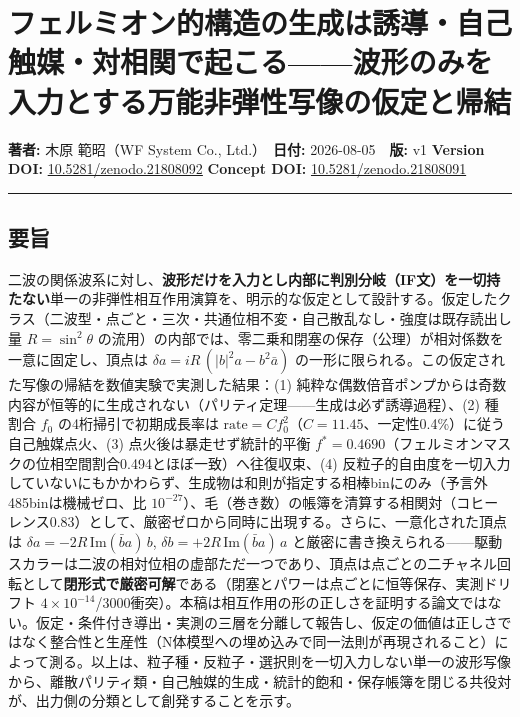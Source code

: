 \documentclass[
  a4paper,
]{ltjsarticle}
\author{}
\date{}
\begin{document}
\section{フェルミオン的構造の生成は誘導・自己触媒・対相関で起こる------波形のみを入力とする万能非弾性写像の仮定と帰結}\label{ux30d5ux30a7ux30ebux30dfux30aaux30f3ux7684ux69cbux9020ux306eux751fux6210ux306fux8a98ux5c0eux81eaux5df1ux89e6ux5a92ux5bfeux76f8ux95a2ux3067ux8d77ux3053ux308bux6ce2ux5f62ux306eux307fux3092ux5165ux529bux3068ux3059ux308bux4e07ux80fdux975eux5f3eux6027ux5199ux50cfux306eux4eeeux5b9aux3068ux5e30ux7d50}

\textbf{著者:} 木原 範昭（WF System Co., Ltd.）　\textbf{日付:}
2026-08-05　\textbf{版:} v1 \textbf{Version DOI:}
\href{https://doi.org/10.5281/zenodo.21808092}{10.5281/zenodo.21808092}
\textbf{Concept DOI:}
\href{https://doi.org/10.5281/zenodo.21808091}{10.5281/zenodo.21808091}

\begin{center}\rule{0.5\linewidth}{0.5pt}\end{center}

\subsection{要旨}\label{ux8981ux65e8}

二波の関係波系に対し、\textbf{波形だけを入力とし内部に判別分岐（IF文）を一切持たない}単一の非弾性相互作用演算を、明示的な仮定として設計する。仮定したクラス（二波型・点ごと・三次・共通位相不変・自己散乱なし・強度は既存読出し量
\(R=\sin^2\theta\)
の流用）の内部では、零二乗和閉塞の保存（公理）が相対係数を一意に固定し、頂点は
\(\delta a = i R\,(|b|^2 a - b^2 \bar a)\)
の一形に限られる。この仮定された写像の帰結を数値実験で実測した結果：(1)
純粋な偶数倍音ポンプからは奇数内容が恒等的に生成されない（パリティ定理------生成は必ず誘導過程）、(2)
種割合 \(f_0\) の4桁掃引で初期成長率は
\(\mathrm{rate}=C f_0^2\)（\(C=11.45\)、一定性0.4\%）に従う自己触媒点火、(3)
点火後は暴走せず統計的平衡
\(f^*=0.4690\)（フェルミオンマスクの位相空間割合0.494とほぼ一致）へ往復収束、(4)
反粒子的自由度を一切入力していないにもかかわらず、生成物は和則が指定する相棒binにのみ（予言外485binは機械ゼロ、比
\(10^{-27}\)）、毛（巻き数）の帳簿を清算する相関対（コヒーレンス0.83）として、厳密ゼロから同時に出現する。さらに、一意化された頂点は
\(\delta a = -2R\,\mathrm{Im}(\bar b a)\,b\),
\(\delta b = +2R\,\mathrm{Im}(\bar b a)\,a\)
と厳密に書き換えられる------駆動スカラーは二波の相対位相の虚部ただ一つであり、頂点は点ごとの二チャネル回転として\textbf{閉形式で厳密可解}である（閉塞とパワーは点ごとに恒等保存、実測ドリフト
\(4\times10^{-14}\)/3000衝突）。本稿は相互作用の形の正しさを証明する論文ではない。仮定・条件付き導出・実測の三層を分離して報告し、仮定の価値は正しさではなく整合性と生産性（N体模型への埋め込みで同一法則が再現されること）によって測る。以上は、粒子種・反粒子・選択則を一切入力しない単一の波形写像から、離散パリティ類・自己触媒的生成・統計的飽和・保存帳簿を閉じる共役対が、出力側の分類として創発することを示す。
\end{document}
